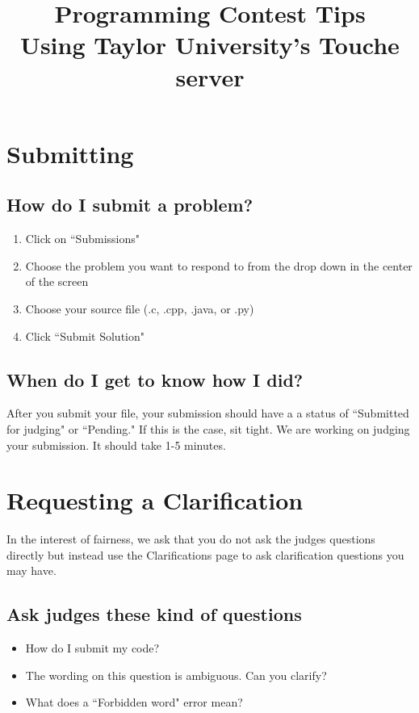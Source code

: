 \documentclass{article}
\begin{document}
	\title{
		{\LARGE Programming Contest Tips} \\
		{\large Using Taylor University's Touche server}}
	\date{}
	\maketitle{}
	
	\section{Submitting}
	\subsection{How do I submit a problem?}
	\begin{enumerate}
		\item Click on ``Submissions"
		\item Choose the problem you want to respond to from the drop down in the center of the screen
		\item Choose your source file (.c, .cpp, .java, or .py)
		\item Click ``Submit Solution"
	\end{enumerate}
	
	\subsection{When do I get to know how I did?}
	After you submit your file, your submission should have a a status of ``Submitted for judging" or ``Pending."
	If this is the case, sit tight. We are working on judging your submission. 
	It should take 1-5 minutes.
	
	\section{Requesting a Clarification}
	In the interest of fairness, we ask that you do not ask the judges questions directly 
	but instead use the Clarifications page to ask clarification questions you may have. 
	
	\subsection{Ask judges these kind of questions}
	\begin{itemize}
		\item How do I submit my code?
		\item The wording on this question is ambiguous. Can you clarify?
		\item What does a ``Forbidden word" error mean?
	\end{itemize}
\end{document}

